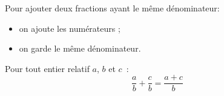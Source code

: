 Pour ajouter deux fractions ayant le même dénominateur:
\begin{itemize}
    \item on ajoute les numérateurs ;
    \item on garde le même dénominateur.
\end{itemize}
Pour tout entier relatif $a$, $b$ et $c$~:
$$\dfrac ab+\dfrac cb=\dfrac{a+c}b$$